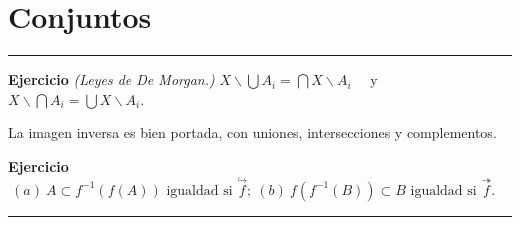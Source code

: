 \section*{Conjuntos}

\- \hrule  
\begin{proposition}
  \textbf{Ejercicio} \emph{(Leyes de De Morgan.)} \(\displaystyle X\backslash \bigcup A_i = \bigcap X\backslash A_i\) \ \ y \ \ \(\displaystyle X \backslash\bigcap A_i = \bigcup X\backslash A_i\). 
\end{proposition}

\begin{exercise}
  La imagen inversa es bien portada, con uniones, intersecciones y complementos. 
\end{exercise}


\begin{proposition}
  \textbf{Ejercicio} \(\displaystyle \ (a)\  A\subset f^{-1}(f(A))\text{ igualdad si } \overset{\hookrightarrow}{f}; \ (b) \  f(f^{-1}(B)) \subset B \text{ igualdad si } \overset{\twoheadrightarrow}{f}\). 
\end{proposition}
\hrule 
